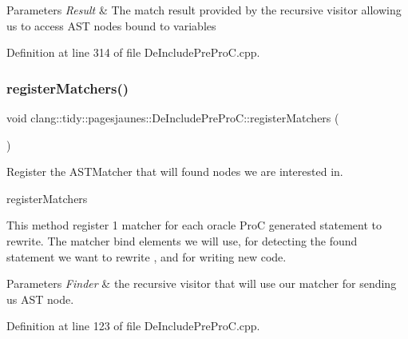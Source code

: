 \begin{DoxyParams}{Parameters}
{\em Result} & The match result provided by the recursive visitor allowing us to access A\+ST nodes bound to variables \\
\hline
\end{DoxyParams}


Definition at line 314 of file De\+Include\+Pre\+Pro\+C.\+cpp.

\mbox{\label{classclang_1_1tidy_1_1pagesjaunes_1_1_de_include_pre_pro_c_a106ba63622e7283145e674287dc8749a}} 
\subsubsection{\texorpdfstring{register\+Matchers()}{registerMatchers()}}
{\footnotesize\ttfamily void clang\+::tidy\+::pagesjaunes\+::\+De\+Include\+Pre\+Pro\+C\+::register\+Matchers (\begin{DoxyParamCaption}\item[{ast\+\_\+matchers\+::\+Match\+Finder $\ast$}]{ }\end{DoxyParamCaption})\hspace{0.3cm}{\ttfamily [override]}}



Register the A\+S\+T\+Matcher that will found nodes we are interested in. 

register\+Matchers

This method register 1 matcher for each oracle ProC generated statement to rewrite. The matcher bind elements we will use, for detecting the found statement we want to rewrite , and for writing new code.


\begin{DoxyParams}{Parameters}
{\em Finder} & the recursive visitor that will use our matcher for sending us A\+ST node. \\
\hline
\end{DoxyParams}


Definition at line 123 of file De\+Include\+Pre\+Pro\+C.\+cpp.

\mbox{\label{classclang_1_1tidy_1_1pagesjaunes_1_1_de_include_pre_pro_c_a9367e569272a7897ae9f899a5d36fea6}} 
